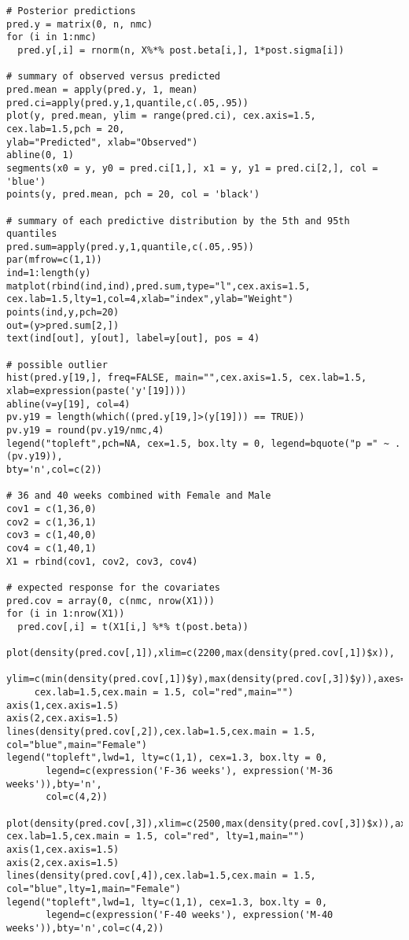 \documentclass[a4paper, 11pt]{article}
\begin{document}
\begin{verbatim}
# Posterior predictions
pred.y = matrix(0, n, nmc)
for (i in 1:nmc)
  pred.y[,i] = rnorm(n, X%*% post.beta[i,], 1*post.sigma[i])

# summary of observed versus predicted
pred.mean = apply(pred.y, 1, mean)
pred.ci=apply(pred.y,1,quantile,c(.05,.95))
plot(y, pred.mean, ylim = range(pred.ci), cex.axis=1.5, cex.lab=1.5,pch = 20, 
ylab="Predicted", xlab="Observed")
abline(0, 1)
segments(x0 = y, y0 = pred.ci[1,], x1 = y, y1 = pred.ci[2,], col = 'blue')
points(y, pred.mean, pch = 20, col = 'black')

# summary of each predictive distribution by the 5th and 95th quantiles
pred.sum=apply(pred.y,1,quantile,c(.05,.95))
par(mfrow=c(1,1))
ind=1:length(y)
matplot(rbind(ind,ind),pred.sum,type="l",cex.axis=1.5, cex.lab=1.5,lty=1,col=4,xlab="index",ylab="Weight")
points(ind,y,pch=20)
out=(y>pred.sum[2,])
text(ind[out], y[out], label=y[out], pos = 4)

# possible outlier
hist(pred.y[19,], freq=FALSE, main="",cex.axis=1.5, cex.lab=1.5, 
xlab=expression(paste('y'[19])))
abline(v=y[19], col=4)
pv.y19 = length(which((pred.y[19,]>(y[19])) == TRUE))
pv.y19 = round(pv.y19/nmc,4)
legend("topleft",pch=NA, cex=1.5, box.lty = 0, legend=bquote("p =" ~ .(pv.y19)),
bty='n',col=c(2))

# 36 and 40 weeks combined with Female and Male
cov1 = c(1,36,0)
cov2 = c(1,36,1)
cov3 = c(1,40,0)
cov4 = c(1,40,1)
X1 = rbind(cov1, cov2, cov3, cov4)

# expected response for the covariates
pred.cov = array(0, c(nmc, nrow(X1)))
for (i in 1:nrow(X1))
  pred.cov[,i] = t(X1[i,] %*% t(post.beta))

plot(density(pred.cov[,1]),xlim=c(2200,max(density(pred.cov[,1])$x)), 
     ylim=c(min(density(pred.cov[,1])$y),max(density(pred.cov[,3])$y)),axes=FALSE,
     cex.lab=1.5,cex.main = 1.5, col="red",main="")
axis(1,cex.axis=1.5)
axis(2,cex.axis=1.5) 
lines(density(pred.cov[,2]),cex.lab=1.5,cex.main = 1.5, col="blue",main="Female")
legend("topleft",lwd=1, lty=c(1,1), cex=1.3, box.lty = 0, 
       legend=c(expression('F-36 weeks'), expression('M-36 weeks')),bty='n',
       col=c(4,2))

plot(density(pred.cov[,3]),xlim=c(2500,max(density(pred.cov[,3])$x)),axes=FALSE,
cex.lab=1.5,cex.main = 1.5, col="red", lty=1,main="")
axis(1,cex.axis=1.5)
axis(2,cex.axis=1.5) 
lines(density(pred.cov[,4]),cex.lab=1.5,cex.main = 1.5, col="blue",lty=1,main="Female")
legend("topleft",lwd=1, lty=c(1,1), cex=1.3, box.lty = 0, 
       legend=c(expression('F-40 weeks'), expression('M-40 weeks')),bty='n',col=c(4,2))


\end{verbatim}
\end{document}

